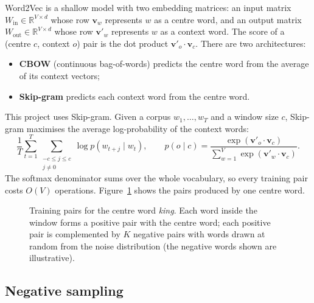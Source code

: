 Word2Vec \citep{mikolov2013efficient} is a shallow model with two embedding matrices: an input matrix $W_{\text{in}} \in \mathbb{R}^{V \times d}$ whose row $\mathbf{v}_w$ represents $w$ as a centre word, and an output matrix $W_{\text{out}} \in \mathbb{R}^{V \times d}$ whose row $\mathbf{v}'_w$ represents $w$ as a context word. The score of a (centre $c$, context $o$) pair is the dot product $\mathbf{v}'_o \cdot \mathbf{v}_c$. There are two architectures:
\begin{itemize}
    \item \textbf{CBOW} (continuous bag-of-words) predicts the centre word from the average of its context vectors;
    \item \textbf{Skip-gram} predicts each context word from the centre word.
\end{itemize}
This project uses Skip-gram. Given a corpus $w_1, \dots, w_T$ and a window size $c$, Skip-gram maximises the average log-probability of the context words:
\begin{equation}
    \frac{1}{T} \sum_{t=1}^{T} \sum_{\substack{-c \leq j \leq c \\ j \neq 0}} \log p(w_{t+j} \mid w_t),
    \qquad
    p(o \mid c) = \frac{\exp(\mathbf{v}'_o \cdot \mathbf{v}_c)}{\sum_{w=1}^{V} \exp(\mathbf{v}'_w \cdot \mathbf{v}_c)} .
    \label{eq:skipgram}
\end{equation}
The softmax denominator sums over the whole vocabulary, so every training pair costs $O(V)$ operations. Figure~\ref{fig:skipgram} shows the pairs produced by one centre word.

\begin{figure}[t]
    \centering
    
    \caption{Training pairs for the centre word \textit{king}. Each word inside the window forms a positive pair with the centre word; each positive pair is complemented by $K$ negative pairs with words drawn at random from the noise distribution (the negative words shown are illustrative).}
    \label{fig:skipgram}
\end{figure}

\subsection{Negative sampling}
\label{sec:background-ns}

